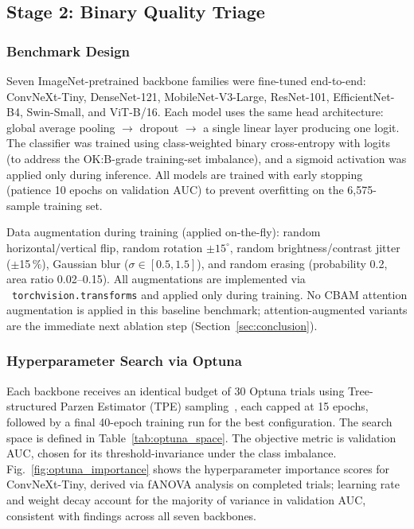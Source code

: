 \documentclass[conference]{IEEEtran}
\begin{document}
\subsection{Stage 2: Binary Quality Triage}
\label{sec:stage2}

\subsubsection{Benchmark Design}
Seven ImageNet-pretrained backbone families were fine-tuned end-to-end: ConvNeXt-Tiny, DenseNet-121, MobileNet-V3-Large, ResNet-101, EfficientNet-B4, Swin-Small, and ViT-B/16. Each model uses the same head architecture: global average pooling $\to$ dropout $\to$ a single linear layer producing one logit. The classifier was trained using class-weighted binary cross-entropy with logits (to address the OK:B-grade training-set imbalance), and a sigmoid activation was applied only during inference. All models are trained with early stopping (patience 10 epochs on validation AUC) to prevent overfitting on the 6{,}575-sample training set.

Data augmentation during training (applied on-the-fly): random horizontal/vertical flip, random rotation $\pm15^\circ$, random brightness/contrast jitter ($\pm$15\,\%), Gaussian blur ($\sigma \in [0.5, 1.5]$), and random erasing (probability 0.2, area ratio 0.02--0.15). All augmentations are implemented via \ \texttt{torchvision.transforms} and applied only during training. No CBAM attention augmentation is applied in this baseline benchmark; attention-augmented variants are the immediate next ablation step (Section~\ref{sec:conclusion}).

\subsubsection{Hyperparameter Search via Optuna}
Each backbone receives an identical budget of 30 Optuna trials using Tree-structured Parzen Estimator (TPE) sampling~\cite{akiba2019}, each capped at 15 epochs, followed by a final 40-epoch training run for the best configuration. The search space is defined in Table~\ref{tab:optuna_space}. The objective metric is validation AUC, chosen for its threshold-invariance under the class imbalance. Fig.~\ref{fig:optuna_importance} shows the hyperparameter importance scores for ConvNeXt-Tiny, derived via fANOVA analysis on completed trials; learning rate and weight decay account for the majority of variance in validation AUC, consistent with findings across all seven backbones.
\end{document}
